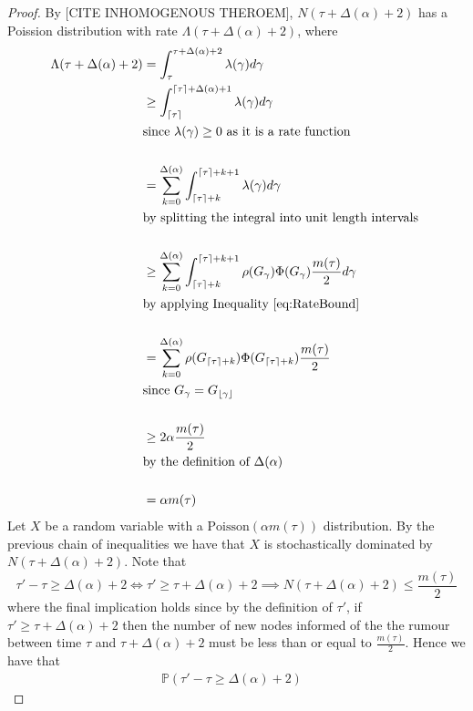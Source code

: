 \begin{proof}
	By [CITE INHOMOGENOUS THEROEM], $N(\tau + \Delta(\alpha) + 2)$ has a Poission distribution with rate $\Lambda(\tau + \Delta(\alpha) + 2)$, where
	\begin{align*}
		\Lambda(\tau + \Delta(\alpha) + 2) &= \int_\tau^{\tau + \Delta(\alpha) + 2} \lambda(\gamma) d\gamma \\
		& \geq \int_{\lceil\tau\rceil}^{{\lceil\tau\rceil} + \Delta(\alpha) + 1} \lambda(\gamma) d\gamma \\
		& \text{since } \lambda(\gamma) \geq 0 \text{ as it is a rate function}\\
		& \\
		& = \sum_{k=0}^{\Delta(\alpha)} \int_{\lceil\tau\rceil + k}^{{\lceil\tau\rceil} + k + 1} \lambda(\gamma) d\gamma \\
		& \text{by splitting the integral into unit length intervals } \\
		& \\
		& \geq \sum_{k=0}^{\Delta(\alpha)} \int_{\lceil\tau\rceil + k}^{{\lceil\tau\rceil} + k + 1} \rho(G_\gamma)\Phi(G_\gamma)\frac{m(\tau)}{2} d\gamma \\
		& \text{by applying Inequality } \ref{eq:RateBound} \\
		& \\
		& = \sum_{k=0}^{\Delta(\alpha)} \rho(G_{\lceil\tau\rceil + k})\Phi(G_{\lceil\tau\rceil + k})\frac{m(\tau)}{2} \\
		& \text{since } G_\gamma = G_{\lfloor\gamma\rfloor} \\
		& \\
		& \geq 2\alpha\frac{m(\tau)}{2} \\
		& \text{by the definition of } \Delta(\alpha) \\
		& \\
		& = \alpha m(\tau)
	\end{align*}
	Let $X$ be a random variable with a $\text{Poisson}(\alpha m(\tau))$ distribution. 
	By the previous chain of inequalities we have that $X$ is stochastically dominated by $N(\tau + \Delta(\alpha) + 2)$. %
	Note that
	$$
		\tau' - \tau \geq \Delta(\alpha) + 2 \iff 
		\tau' \geq \tau + \Delta(\alpha) + 2 \implies 
		N(\tau + \Delta(\alpha) + 2) \leq \frac{m(\tau)}{2}
	$$
	where the final implication holds since by the definition of $\tau'$, if $\tau' \geq \tau + \Delta(\alpha) + 2$ then the number of new nodes informed of the the rumour between time $\tau$ and $\tau + \Delta(\alpha) + 2$ must be less than or equal to $\frac{m(\tau)}{2}$. Hence we have that
	\begin{align*}
		\mathbb{P}(\tau' - \tau \geq \Delta(\alpha) + 2) & 

\end{align*}
\end{proof}
